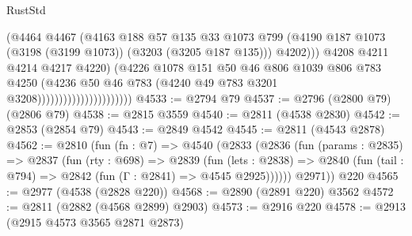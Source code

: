 \begin{lexlean}{RustStd}
\begin{coremodule}
                                              (@4464
                                                @4467
                                                (@4163
                                                  @188
                                                  @57
                                                  @135
                                                  @33
                                                  @1073
                                                  @799
                                                  (@4190
                                                    @187
                                                    @1073
                                                    (@3198 (@3199 @1073))
                                                    (@3203 (@3205 @187 @135)))
                                                  @4202)))
                                            @4208
                                            @4211
                                            @4214
                                            @4217
                                            @4220)
                                          (@4226
                                            @1078
                                            @151
                                            @50
                                            @46
                                            @806
                                            @1039
                                            @806
                                            @783
                                            @4250
                                            (@4236
                                              @50
                                              @46
                                              @783
                                              (@4240 @49 @783 @3201 @3208))))))))))))))))))))))
@4533 := @2794 @79
@4537 := @2796 (@2800 @79) (@2806 @79)
@4538 := @2815 @3559
@4540 := @2811 (@4538 @2830)
@4542 := @2853 (@2854 @79)
@4543 := @2849 @4542
@4545 := @2811 (@4543 @2878)
@4562 := @2810
    (fun (fn : @7) =>
    @4540
      (@2833
        (@2836
          (fun (params : @2835) =>
          @2837
            (fun (rty : @698) =>
            @2839
              (fun (lets : @2838) =>
              @2840 (fun (tail : @794) => @2842 (fun (Γ : @2841) => @4545 @2925))))))
        @2971))
    @220
@4565 := @2977 (@4538 (@2828 @220))
@4568 := @2890 (@2891 @220) @3562
@4572 := @2811 (@2882 (@4568 @2899) @2903)
@4573 := @2916 @220
@4578 := @2913 (@2915 @4573 @3565 @2871 @2873)

\end{coremodule}
\end{lexlean}
